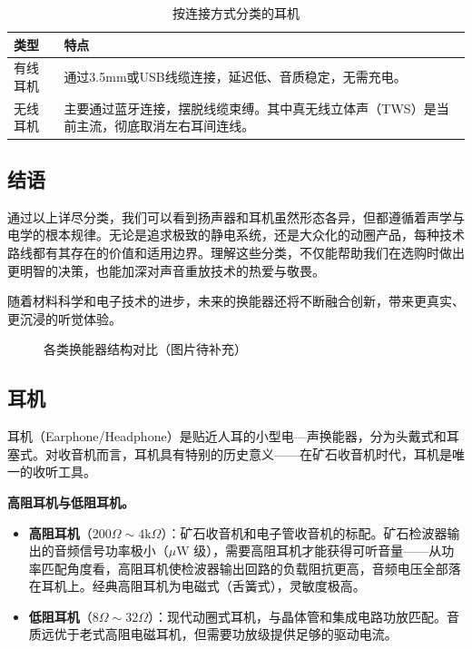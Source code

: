 \documentclass[12pt,UTF8]{ctexbook}
\begin{document}
\begin{table}[h]
\centering
\caption{按连接方式分类的耳机}
\begin{tabular}{p{3cm}p{8cm}}
\toprule
\textbf{类型} & \textbf{特点} \\
\midrule
有线耳机 & 通过3.5mm或USB线缆连接，延迟低、音质稳定，无需充电。 \\
无线耳机 & 主要通过蓝牙连接，摆脱线缆束缚。其中真无线立体声（TWS）是当前主流，彻底取消左右耳间连线。 \\
\bottomrule
\end{tabular}
\end{table}
	
\subsection{结语}

通过以上详尽分类，我们可以看到扬声器和耳机虽然形态各异，但都遵循着声学与电学的根本规律。无论是追求极致的静电系统，还是大众化的动圈产品，每种技术路线都有其存在的价值和适用边界。理解这些分类，不仅能帮助我们在选购时做出更明智的决策，也能加深对声音重放技术的热爱与敬畏。
	
随着材料科学和电子技术的进步，未来的换能器还将不断融合创新，带来更真实、更沉浸的听觉体验。
	
	\begin{figure}[h]
		\centering
		\caption{各类换能器结构对比（图片待补充）}
		\label{fig:appendix}
	\end{figure}




\subsection{耳机}

耳机（Earphone/Headphone）是贴近人耳的小型电—声换能器，分为头戴式和耳塞式。对收音机而言，耳机具有特别的历史意义——在矿石收音机时代，耳机是唯一的收听工具。

\textbf{高阻耳机与低阻耳机。}
\begin{itemize}
  \item \textbf{高阻耳机}（$200\Omega\sim4\mathrm{k}\Omega$）：矿石收音机和电子管收音机的标配。矿石检波器输出的音频信号功率极小（$\mu\mathrm{W}$ 级），需要高阻耳机才能获得可听音量——从功率匹配角度看，高阻耳机使检波器输出回路的负载阻抗更高，音频电压全部落在耳机上。经典高阻耳机为电磁式（舌簧式），灵敏度极高。
  \item \textbf{低阻耳机}（$8\Omega\sim32\Omega$）：现代动圈式耳机，与晶体管和集成电路功放匹配。音质远优于老式高阻电磁耳机，但需要功放级提供足够的驱动电流。
\end{itemize}
\end{document}
